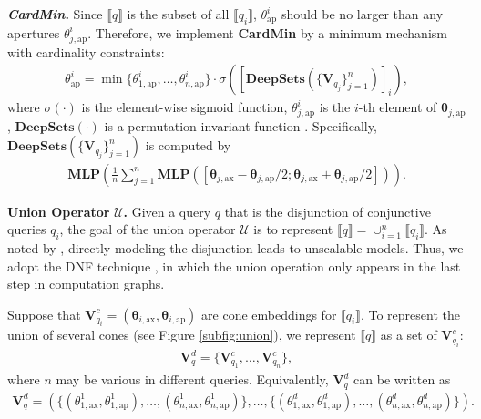 \documentclass{article}
\newcommand{\gb}[1]{\boldsymbol{#1}}
\newcommand{\taxis}{\text{ax}}
\newcommand{\targ}{\text{ap}}
\begin{document}
\textbf{\textit{CardMin}.} Since $\llbracket q\rrbracket$ is the subset of all $\llbracket q_i\rrbracket$, $\theta_{\targ}^i$ should be no larger than any apertures $\theta_{j,\targ}^i$. Therefore, we implement \textbf{CardMin} by a minimum mechanism with cardinality constraints: 
\begin{align*}
    \theta_{\targ}^i=\min\{{\theta}_{1,\targ}^i,\dots,{\theta}_{n,\targ}^i\}\cdot \sigma([\textbf{DeepSets}(\{\textbf{V}_{q_j}\}_{j=1}^n)]_i),
\end{align*}
where $\sigma(\cdot)$ is the element-wise sigmoid function, ${\theta}_{j,\targ}^i$ is the $i$-th element of $\gb{\theta}_{j,\targ}$, $\textbf{DeepSets}(\cdot)$ is a permutation-invariant function \cite{deepsets}. Specifically, $\textbf{DeepSets}(\{\textbf{V}_{q_j}\}_{j=1}^n)$ is computed by
\begin{align*}
    \textbf{MLP}\left(\frac{1}{n}\sum\nolimits_{j=1}^n\textbf{MLP}\left([\gb{\theta}_{j,\taxis}-\gb{\theta}_{j,\targ}/2;\gb{\theta}_{j,\taxis}+\gb{\theta}_{j,\targ}/2]\right)\right).
\end{align*}


\textbf{Union Operator} $\mathcal{U}$\textbf{.} Given a query $q$ that is the disjunction of conjunctive queries $q_i$, the goal of the union operator $\mathcal{U}$ is to represent $\llbracket q\rrbracket = \cup_{i=1}^n\llbracket q_i\rrbracket$. As noted by \citet{q2b}, directly modeling the disjunction leads to unscalable models. Thus, we adopt the DNF technique \cite{q2b}, in which the union operation only appears in the last step in computation graphs.

Suppose that $\textbf{V}_{q_i}^c=(\gb{\theta}_{i,\taxis}, \gb{\theta}_{i,\targ})$ are cone embeddings for $\llbracket q_i\rrbracket$. To represent the union of several cones (see Figure \ref{subfig:union}), we represent $\llbracket q\rrbracket$ as a set of $\textbf{V}_{q_i}^c$:
\begin{align*}
    \textbf{V}_{q}^d=\{\textbf{V}_{q_1}^c, \dots, \textbf{V}_{q_n}^c\},
\end{align*}
where $n$ may be various in different queries. Equivalently, $\textbf{V}_{q}^d$ can be written as 
\begin{align*}
    \textbf{V}_{q}^d=\left( \{({\theta}_{1,\taxis}^1, {\theta}_{1,\targ}^1), \dots, ({\theta}_{n,\taxis}^1, {\theta}_{n,\targ}^1)\}, \dots, \{({\theta}_{1,\taxis}^d, {\theta}_{1,\targ}^d), \dots, ({\theta}_{n,\taxis}^d, {\theta}_{n,\targ}^d)\} \right).
\end{align*}
\end{document}
